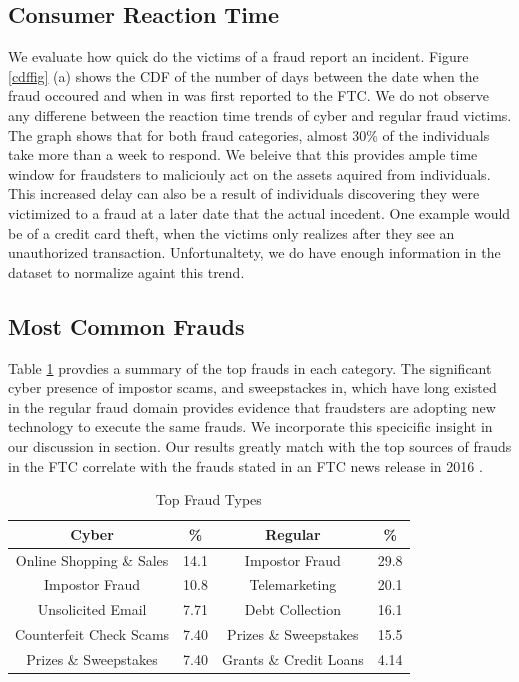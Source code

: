 \documentclass[conference]{IEEEtran}
\begin{document}
\subsection{Consumer Reaction Time}\label{fraudsters}

We evaluate how quick do the victims of a fraud report an incident. Figure \ref{cdffig} (a) shows the CDF of the number of days between the date when the fraud occoured and when in was first reported to the FTC. We do not observe any differene between the reaction time trends of cyber and regular fraud victims. The graph shows that for both fraud categories, almost 30\% of the individuals take more than a week to respond. We beleive that this provides ample time window for fraudsters to maliciouly act on the assets aquired from individuals. This increased delay can also be a result of individuals discovering they were victimized to a fraud at a later date that the actual incedent. One example would be of a credit card theft, when the victims only realizes after they see an unauthorized transaction. Unfortunaltety, we do have enough information in the dataset to normalize againt this trend.

\subsection{Most Common Frauds}\label{fraudsters}



Table \ref{topfrauds} provdies a summary of the top frauds in each category. The significant cyber presence of impostor scams, and sweepstackes in, which have long existed in the regular fraud domain provides evidence that fraudsters are adopting new technology to execute the same frauds. We incorporate this specicific insight in our discussion in section. Our results greatly match with the top sources of frauds in the FTC correlate with the frauds stated in an FTC news release in 2016 \cite{ftc2015}. 

\begin{table}[h]
\centering
\begin{tabular}{c|c||c|c}
\hline
\bfseries Cyber & \bfseries \% & \bfseries Regular & \bfseries \% \\
\hline
\hline
Online Shopping \& Sales & 14.1 & Impostor Fraud & 29.8\\
\hline
Impostor Fraud & 10.8 & Telemarketing & 20.1\\
\hline
Unsolicited Email & 7.71 & Debt Collection & 16.1\\
\hline
Counterfeit Check Scams	 & 7.40 & Prizes \& Sweepstakes & 15.5 \\
\hline
Prizes \& Sweepstakes & 7.40 & Grants \& Credit Loans & 4.14\\
\hline
\hline
\end{tabular}
\vspace{8pt}
\caption{Top Fraud Types}\label{topfrauds}
\vspace{-15pt}
\end{table}
\end{document}
